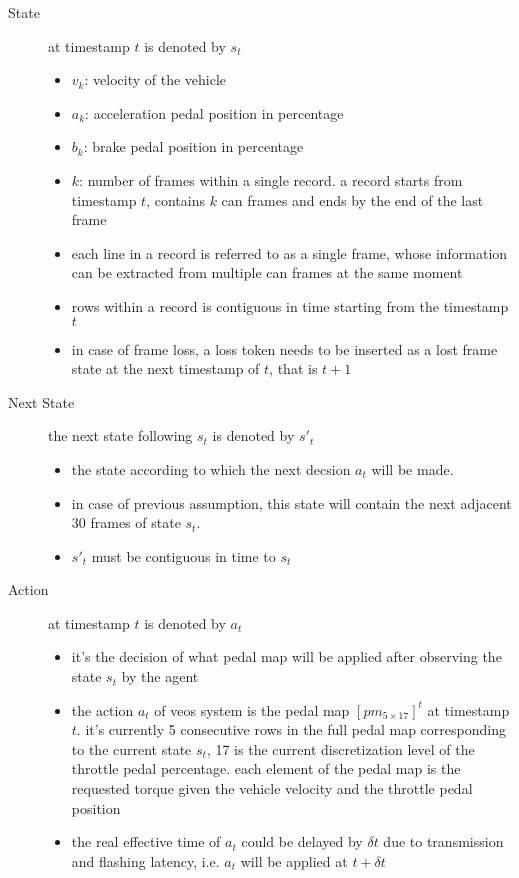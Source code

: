 \documentclass{article}
\begin{document}
\begin{description}
    \item[State] at timestamp $t$ is denoted by $s_t$
      \begin{itemize}
        \item $v_k$: velocity of the vehicle
        \item $a_k$: acceleration pedal position in percentage
        \item $b_k$: brake pedal position in percentage
        \item $k$: number of frames within a single record. a record starts from timestamp $t$, contains $k$ can frames and ends by the end of the last frame
        \item each line in a record is referred to as a single frame, whose information can be extracted from multiple can frames at the same moment
        \item rows within a record is contiguous in time starting from the timestamp $t$
        \item in case of frame loss, a loss token needs to be inserted as a lost frame state at the next timestamp of $t$, that is $t+1$
      \end{itemize}
    \item[Next State] the next state following $s_t$ is denoted by $s'_t$
      \begin{itemize}
        \item the state according to which the next decsion $a_t$ will be made.
        \item in case of previous assumption, this state will contain the next adjacent 30 frames of state $s_t$.
        \item $s'_t$ must be contiguous in time to $s_t$
      \end{itemize}
    \item[Action] at timestamp $t$ is denoted by $a_t$
      \begin{itemize}
        \item it's the decision of what pedal map will be applied after observing the state $s_t$ by the agent
        \item the action $a_t$ of veos system is the pedal map $[pm_{5\times17}]^t$ at timestamp $t$. it's currently 5 consecutive rows in the full pedal map corresponding to the current state $s_t$, 17 is the current discretization level of the throttle pedal percentage. each element of the pedal map is the requested torque given the vehicle velocity and the throttle pedal position
        \item the real effective time of $a_t$ could be delayed by $\delta t$ due to transmission and flashing latency, i.e. $a_t$ will be applied at $t+\delta t$

\end{itemize}
\end{description}
\end{document}
